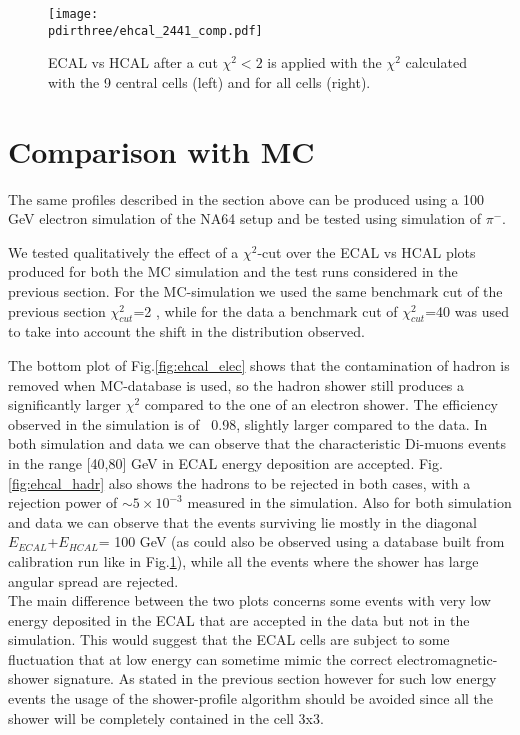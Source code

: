 \begin{figure}[h!]
  \begin{center}
    \texttt{[image: \\pdirthree/ehcal\_2441\_comp.pdf]}
  \end{center}
  \caption[ECAL vs HCAL energy deposit after a cut $\chi^2$ for different ECAL configurations]{ECAL vs HCAL after a cut $\chi^2<2$ is applied with the $\chi^2$ calculated with the 9 central cells (left) and for all cells (right).}
  \label{fig:ehcal_comp}
\end{figure}

\iffalse

\section{Comparison with MC}
\label{ch3:sec:mc}
The same profiles described in the section above can be produced using
a 100 GeV electron simulation of the NA64 setup\cite{na64-simulation} and be tested using simulation of $\pi^-$.

We tested qualitatively the effect of a $\chi^{2}$-cut over the
ECAL vs HCAL plots produced for both the MC simulation
and the test runs considered in the previous section. For the
MC-simulation we used the same benchmark cut of the previous section
$\chi^2_{cut}$=2 , while for the data a benchmark cut of
$\chi^2_{cut}$=40 was used to take into account the shift in the
distribution observed.

The bottom plot of Fig.\ref{fig:ehcal_elec} shows that the
contamination of hadron is removed when MC-database is used, so
the hadron shower still produces a significantly larger $\chi^{2}$
compared to the one of an electron shower. The efficiency
observed in the simulation is of ~0.98, slightly larger compared to the data. 
In both simulation and data we can observe that the characteristic
Di-muons events in the range [40,80] GeV in ECAL energy
deposition are accepted.
Fig.\ref{fig:ehcal_hadr} also shows the hadrons to be rejected in both
cases, with a rejection power of $\sim 5\times 10^{-3}$ measured in the
simulation. Also for both simulation and data we can observe that the
events surviving lie mostly in the diagonal $E_{ECAL}$+$E_{HCAL}$= 100
GeV (as could also be observed using a database built from calibration run like in Fig.\ref{fig:ehcal_comp}), while all the events where the shower has large angular spread are rejected.
\\
The main difference between the two plots concerns some events with very low energy deposited in the ECAL that are accepted in the data but not in the simulation. This would suggest that the ECAL cells are subject to some fluctuation that at low energy can sometime mimic the correct electromagnetic-shower signature. As stated in the previous section however for such low energy events the usage of the shower-profile algorithm should be avoided since all the shower will be completely contained in the cell 3x3.\\



